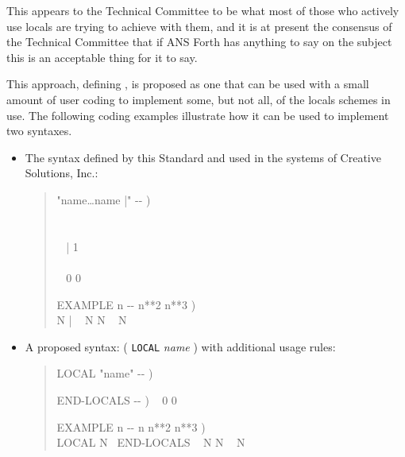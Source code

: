 \begin{intro}
This appears to the Technical Committee to be what most of those who
actively use locals are trying to achieve with them, and it is at
present the consensus of the Technical Committee that if ANS Forth has
anything to say on the subject this is an acceptable thing for it to
say.

This approach, defining , is proposed as one that can be
used with a small amount of user coding to implement some, but not all,
of the locals schemes in use. The following coding examples illustrate
how it can be used to implement two syntaxes.

\begin{itemize}
\item The syntax defined by this Standard and used in the systems of
	Creative Solutions, Inc.:

	\begin{quote}\ttfamily
	\word{:}   "name{\ldots}name |" -{}- ) \\
	\tab {} \\
	\tab~   ~    \\
	\tab~ \word{[CHAR]} | \word{-}  1 \word{-}  ~  \\
	\tab~  \\
	\tab {}  ~ 0 0  \\
	\word{;} 

	\word{:} EXAMPLE  n -{}- n**2 n**3 ) \\
	\tab {} N |
		~ N  N \word{*} ~ N \word{*}
	\word{;}
	\end{quote}

\item A proposed syntax: ( \texttt{LOCAL} \emph{name} ) with
	additional usage rules:

	\begin{quote}\ttfamily
	\word{:} LOCAL  "name" -{}- )
		   
	\word{;} ~

	\word{:} END-LOCALS  -{}- ) ~ 0 0 
	\word{;} ~

	\word{:} EXAMPLE  n -{}- n n**2 n**3 ) \\
	\tab LOCAL N ~END-LOCALS ~
		N  N \word{*} ~  N \word{*}
	\word{;}
	\end{quote}
\end{itemize}


\end{intro}
